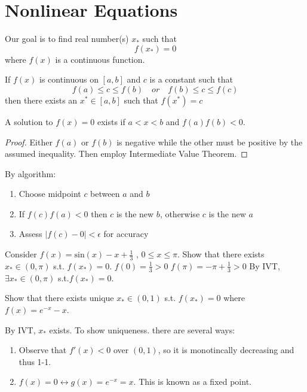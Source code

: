 
\section{Nonlinear Equations}

Our goal is to find real number(s) $x_*$ such that
\[f(x_*) = 0 \]
where $f(x)$ is a continuous function.


\begin{theorem}
	If $f(x)$ is continuous on $[a,b]$ and $c$ is a constant such that
	\[f(a)\leq c \leq f(b) \quad or \quad f(b) \leq c \leq f(c)\]
	then there exists an $x^*\in[a,b]$ such that $f(x^*) =c$
\end{theorem}

\begin{lemma} 
	A solution to $f(x)=0$ exists if $a<x<b$ and $f(a)f(b)<0$.
	\begin{proof} 
		Either $f(a)$ or $f(b)$ is negative while the other must be positive by the assumed inequality. Then employ Intermediate Value Theorem.
	\end{proof}
\end{lemma}


By algorithm:
\begin{enumerate} 
    \item Choose midpoint $c$ between $a$ and $b$
    \item If $f(c)f(a) < 0$ then $c$ is the new $b$, otherwise $c$ is the new $a$
    \item Assess $|f(c) - 0| < \epsilon$ for accuracy
\end{enumerate}

\begin{example} 
    Consider $f(x)=\mathrm{sin}(x)-x+\frac{1}{3}$ , $0\leq x\leq \pi$. Show that there exists $x_*\in(0,\pi)$ s.t. $f(x_*) =0$.
    $f(0) = \frac{1}{3} > 0$
    $f(\pi) = -\pi + \frac{1}{3} >0$
    By IVT, $\exists x_* \in (0,\pi)$ s.t.$f(x_*)=0$.
\end{example}


\begin{example} 
   Show that there exists unique $x_*\in(0,1)$ s.t. $f(x_*)=0$ where $f(x)=e^{-x}-x$.
   
   By IVT, $x_*$ exists. To show uniqueness. there are several ways:
   \begin{enumerate} 
       \item Observe that $f'(x) < 0$ over $(0,1)$, so it is monotincally decreasing and thus 1-1.
       \item $f(x)=0 \leftrightarrow g(x)=e^{-x} =x$. This is known as a fixed point. 
   \end{enumerate}
\end{example}


